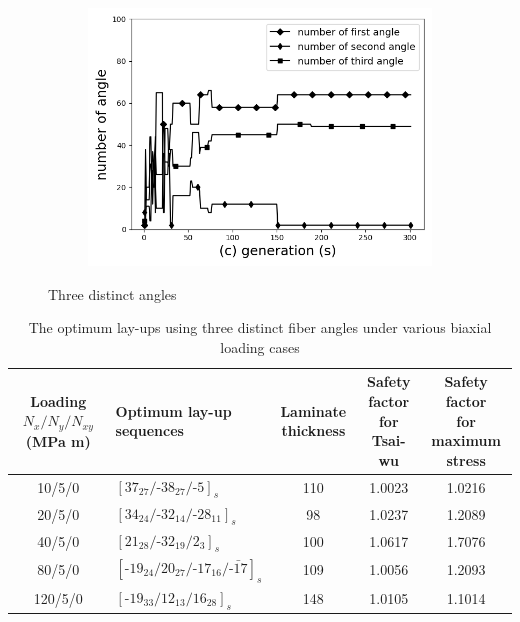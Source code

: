 \begin{figure}[!t]
		\begin{subfigure}[b]{0.8\linewidth}
			\includegraphics[width=\linewidth]{2020-11-10-pre-image/three_distinct_angle_number_of_angle.png}
		\end{subfigure}
	\caption{Three distinct angles}
	\label{fig:three_angles}
\end{figure}


\begin{table}
\normalsize
\caption{The optimum lay-ups using three distinct fiber angles under various biaxial loading cases}
\label{T300/5308 material properties}
\centering
\begin{tabular}{clccc}
	\toprule
	\textbf{Loading} $N_{x}/N_{y}/N_{xy}$ \textbf{(MPa m)}   &
	\makecell{\textbf{Optimum lay-up } \\ \textbf{sequences}  }                        &
	\textbf{Laminate thickness} &  \makecell{\textbf{Safety factor } \\
	\textbf{for Tsai-wu}}  &
	\makecell{\textbf{Safety factor } \\ \textbf{for  maximum stress}}
	 \\
	\midrule
	10/5/0                       &  $[37_{27}/\text{-}38_{27}/\text{-}5]_s$            &     110      &  1.0023 & 1.0216\\
	20/5/0                       &  $[34_{24}/\text{-}32_{14}/\text{-}28_{11}]_s$      &     98       &  1.0237 & 1.2089 \\
	40/5/0                       &  $[21_{28}/\text{-}32_{19}/2_3]_s$                  &     100      &  1.0617 & 1.7076\\
	80/5/0                       &  $[\text{-}19_{24}/20_{27}/\text{-}{17}_{16}/\bar{\text{-}17}]_s$  &  109      &  1.0056 & 1.2093 \\
	120/5/0                      &  $[\text{-}19_{33}/12_{13}/16_{28}]_s$              &     148      &  1.0105 &  1.1014\\
	\bottomrule
\end{tabular}
\end{table}

